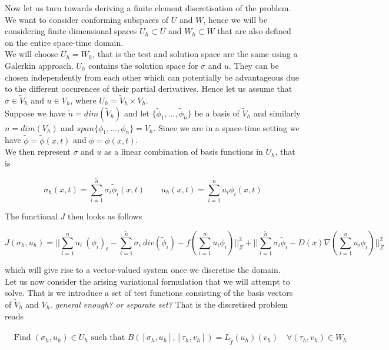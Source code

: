 \documentclass[../draft_1.tex]{subfiles}
\begin{document}
Now let us turn towards deriving a finite element discretisation of the problem. We want to consider conforming subspaces of $U$ and $W$, hence we will be considering finite dimensional spaces $U_h \subset U$ and $W_h \subset W$ that are also defined on the entire space-time domain. 
\smallskip
\\
We will choose $U_h = W_h$, that is the test and solution space are the same using a Galerkin approach. $U_h$ contains the solution space for $\sigma$ and $u$. They can be chosen independently from each other which can potentially be advantageous due to the different occurences of their partial derivatives. Hence let us assume that $\sigma \in \tilde{V}_h$ and $u \in V_h$, where $ U_h = \tilde{V}_h \times V_h$. 
\smallskip
\\ 
Suppose we have $\tilde{n} = dim(\tilde{V}_h)$ and let $ \{\tilde{\phi}_1, ..., \tilde{\phi}_{\tilde{n}}\} $ be a basis of $\tilde{V}_h$ and similarly $n = dim(V_h)$ and $span \{\phi_1, ..., \phi_n\}  = V_h$. Since we are in a space-time setting we have $\tilde{\phi} = \tilde{\phi}(x,t)$ and  $\phi = \phi(x,t)$.
\smallskip
\\ 
We then represent $\sigma$ and $u$ as a linear combination of basis functions in $U_h$, that is
\begin{ceqn}
	\begin{equation}
 	\sigma_h(x,t) = \sum_{i = 1}^{\tilde{n}} \sigma_i \tilde{\phi}_i(x,t) \qquad 
	u_h(x,t) = \sum_{i = 1}^{n} u_i \phi_i(x,t) 
	\end{equation}
\end{ceqn}
The functional $J$ then looks as follows 
\begin{ceqn}
	\begin{equation}
J(\sigma_h, u_h) =|| \sum_{i=1}^{n} u_i \ (\phi_i)_t - \sum_{i=1}^{\tilde{n}} \sigma_i \ div(\tilde{\phi}_i) - f(\sum_{i=1}^{n} u_i \phi_i) ||_Z^2 + || \sum_{i=1}^{\tilde{n}} \sigma_i \tilde{\phi}_i - D(x) \nabla (\sum_{i=1}^{n} u_i \phi_i) || _Z^2
	\end{equation}
\end{ceqn}
which will give rise to a vector-valued system once we discretise the domain. 
\smallskip
\\ 
Let us now consider the arising variational formulation that we will attempt to solve. That is we introduce a set of test functions consisting of the basis vectors of $\tilde{V}_h$ and $V_h$. \textit{general enough? or separate set?} That is the discretised problem reads 

\begin{ceqn}
	\begin{align}
	\begin{aligned}
	\text{ Find } (\sigma_h, u_h) \in U_h \text{ such that } B ([\sigma_h, u_h], [\tau_h, v_h]) = L_{\tilde{f}}(u_h)(v_h) \quad \forall (\tau_h, v_h) \in W_h 
	\end{aligned}
	\end{align}
\end{ceqn}
\end{document}
